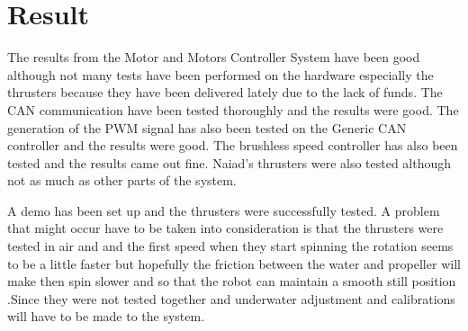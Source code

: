 \section{Result}\label{sec:result}
The results from the Motor and Motors Controller System have been good although not many tests have been performed on the hardware especially the thrusters because they have been delivered lately due to the lack of funds. The CAN communication have been tested thoroughly and the results were good. The generation of the PWM signal has also been tested on the Generic CAN controller and the results were good. The brushless speed controller has also been tested and the results came out fine. Naiad's thrusters were also tested although not as much as other parts of the system.

 A demo has been set up and the thrusters were successfully tested. A problem that might occur have to be taken into consideration is that the thrusters were tested in air and and the first speed when they start spinning the rotation seems to be a little faster but hopefully the friction between the water and propeller will make then spin slower and so that the robot can maintain a smooth still position .Since they were not tested together and underwater adjustment and calibrations will have to be made to the system.  

